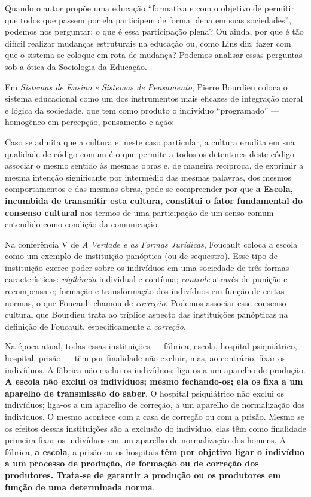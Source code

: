 \documentclass[
  12pt,
  letterpaper,
  DIV=11,
  numbers=noendperiod]{scrartcl}
\newenvironment{citacao}
    {\begin{quoting}[rightmargin=0cm,leftmargin=4cm]
    \begin{singlespace}
    \footnotesize
    }
    {\end{singlespace}
    \end{quoting}
}
\begin{document}
Quando o autor propõe uma educação ``formativa e com o objetivo de
permitir que todos que passem por ela participem de forma plena em suas
sociedades'', podemos nos perguntar: o que é essa participação plena? Ou
ainda, por que é tão difícil realizar mudanças estruturais na educação
ou, como Lins diz, fazer com que o sistema se coloque em rota de
mudança? Podemos analisar essas perguntas sob a ótica da Sociologia da
Educação.

Em \emph{Sistemas de Ensino e Sistemas de Pensamento}, Pierre Bourdieu
coloca o sistema educacional como um dos instrumentos mais eficazes de
integração moral e lógica da sociedade, que tem como produto o indivíduo
``programado'' --- homogêneo em percepção, pensamento e ação:

\begin{citacao}
Caso se admita que a cultura e, neste caso particular, a cultura erudita em sua qualidade de código comum é o que permite a todos os detentores deste código associar o mesmo sentido às mesmas obras e, de maneira recíproca, de exprimir a mesma intenção significante por intermédio das mesmas palavras, dos mesmos comportamentos e das mesmas obras, pode-se compreender por que \textbf{a Escola, incumbida de transmitir esta cultura, constitui o fator fundamental do consenso cultural} nos termos de uma participação de um senso comum entendido como condição da comunicação. \citep{bourdieu}
\end{citacao}

Na conferência V de \emph{A Verdade e as Formas Jurídicas}, Foucault
coloca a escola como um exemplo de instituição panóptica (ou de
sequestro). Esse tipo de instituição exerce poder sobre os indivíduos em
uma sociedade de três formas características: \emph{vigilância}
individual e contínua; \emph{controle} através de punição e recompensa
e; formação e transformação dos indivíduos em função de certas normas, o
que Foucault chamou de \emph{correção}. Podemos associar esse consenso
cultural que Bourdieu trata ao tríplice aspecto das instituições
panópticas na definição de Foucault, especificamente a \emph{correção}.

\begin{citacao}
Na época atual, todas essas instituições --- fábrica, escola, hospital psiquiátrico, hospital, prisão --- têm por finalidade não excluir, mas, ao contrário, fixar os indivíduos. A fábrica não exclui os indivíduos; liga-os a um aparelho de produção. \textbf{A escola não exclui os indivíduos; mesmo fechando-os; ela os fixa a um aparelho de transmissão do saber}. O hospital psiquiátrico não exclui os indivíduos; liga-os a um aparelho de correção, a um aparelho de normalização dos indivíduos. O mesmo acontece com a casa de correção ou com a prisão. Mesmo se os efeitos dessas instituições são a exclusão
do indivíduo, elas têm como finalidade primeira fixar os indivíduos em um aparelho de normalização dos homens. A fábrica, \textbf{a escola}, a prisão ou os hospitais \textbf{têm por objetivo ligar o indivíduo a um processo de produção, de formação ou de correção dos produtores. Trata-se de garantir a produção ou os produtores em função de uma determinada norma}. \citep[p.~114]{foucault}
\end{citacao}
\end{document}
